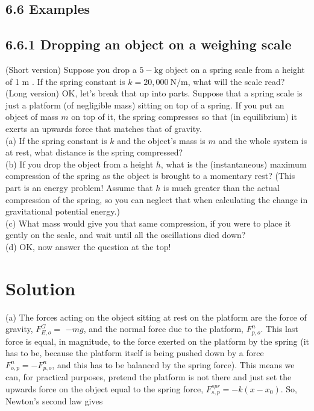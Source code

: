 \documentclass[10pt]{article}
\begin{document}
\subsection*{6.6 Examples}
\subsection*{6.6.1 Dropping an object on a weighing scale}
(Short version) Suppose you drop a $5-\mathrm{kg}$ object on a spring scale from a height of 1 m . If the spring constant is $k=20,000 \mathrm{~N} / \mathrm{m}$, what will the scale read?\\
(Long version) OK, let's break that up into parts. Suppose that a spring scale is just a platform (of negligible mass) sitting on top of a spring. If you put an object of mass $m$ on top of it, the spring compresses so that (in equilibrium) it exerts an upwards force that matches that of gravity.\\
(a) If the spring constant is $k$ and the object's mass is $m$ and the whole system is at rest, what distance is the spring compressed?\\
(b) If you drop the object from a height $h$, what is the (instantaneous) maximum compression of the spring as the object is brought to a momentary rest? (This part is an energy problem! Assume that $h$ is much greater than the actual compression of the spring, so you can neglect that when calculating the change in gravitational potential energy.)\\
(c) What mass would give you that same compression, if you were to place it gently on the scale, and wait until all the oscillations died down?\\
(d) OK, now answer the question at the top!

\section*{Solution}
(a) The forces acting on the object sitting at rest on the platform are the force of gravity, $F_{E, o}^{G}=$ $-m g$, and the normal force due to the platform, $F_{p, o}^{n}$. This last force is equal, in magnitude, to the force exerted on the platform by the spring (it has to be, because the platform itself is being pushed down by a force $F_{o, p}^{n}=-F_{p, o}^{n}$, and this has to be balanced by the spring force). This means we can, for practical purposes, pretend the platform is not there and just set the upwards force on the object equal to the spring force, $F_{s, p}^{s p r}=-k\left(x-x_{0}\right)$. So, Newton's second law gives
\end{document}
